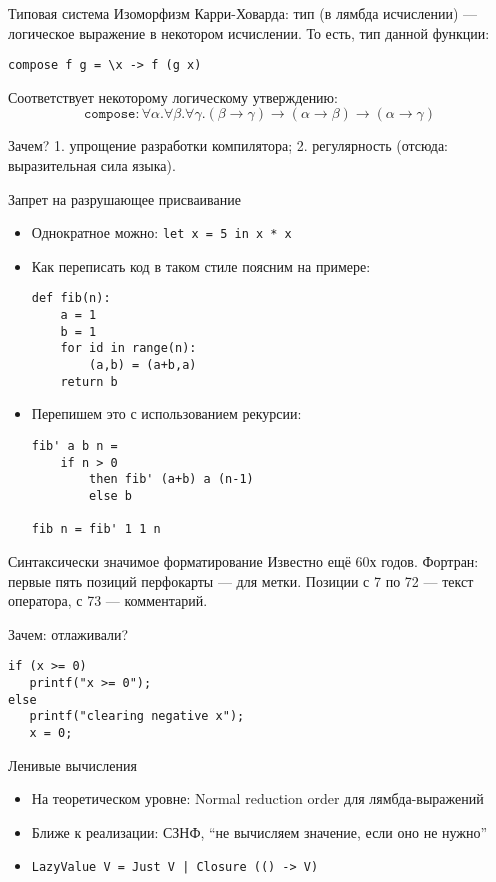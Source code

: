 \documentclass[aspectratio=169]{beamer}
\begin{document}
\begin{frame}[fragile]{Типовая система}
Изоморфизм Карри-Ховарда: тип (в лямбда исчислении) --- логическое выражение в некотором исчислении.
То есть, тип данной функции:
\begin{center}
\verb!compose f g = \x -> f (g x)!
\end{center}

Соответствует некоторому логическому утверждению:
$$\texttt{compose}: \forall \alpha.\forall \beta.\forall \gamma.(\beta\rightarrow\gamma)\rightarrow(\alpha\rightarrow\beta)\rightarrow(\alpha\rightarrow\gamma)$$

Зачем? 1. упрощение разработки компилятора; 2. регулярность (отсюда: выразительная сила языка).
\end{frame}

\begin{frame}[fragile]{Запрет на разрушающее присваивание}
\begin{itemize}
\item Однократное можно: \verb!let x = 5 in x * x!
\item Как переписать код в таком стиле поясним на примере:
\begin{verbatim}
def fib(n):
    a = 1
    b = 1
    for id in range(n):
        (a,b) = (a+b,a)
    return b 
\end{verbatim}
\item Перепишем это с использованием рекурсии:
\begin{verbatim}
fib' a b n = 
    if n > 0 
        then fib' (a+b) a (n-1)
        else b

fib n = fib' 1 1 n
\end{verbatim}
\end{itemize}
\end{frame}

\begin{frame}[fragile]{Синтаксически значимое форматирование}
Известно ещё 60х годов. Фортран: первые пять позиций перфокарты --- для метки. Позиции с 7 по 72 ---
текст оператора, с 73 --- комментарий.

Зачем: отлаживали?

\begin{verbatim}
if (x >= 0)
   printf("x >= 0");
else
   printf("clearing negative x");
   x = 0;
\end{verbatim}
\end{frame}

\begin{frame}[fragile]{Ленивые вычисления}
\begin{itemize}
\item На теоретическом уровне: Normal reduction order для лямбда-выражений
\item Ближе к реализации: СЗНФ, ``не вычисляем значение, если оно не нужно''
\item \verb!LazyValue V = Just V | Closure (() -> V)!
\end{itemize}
\end{frame}
\end{document}
